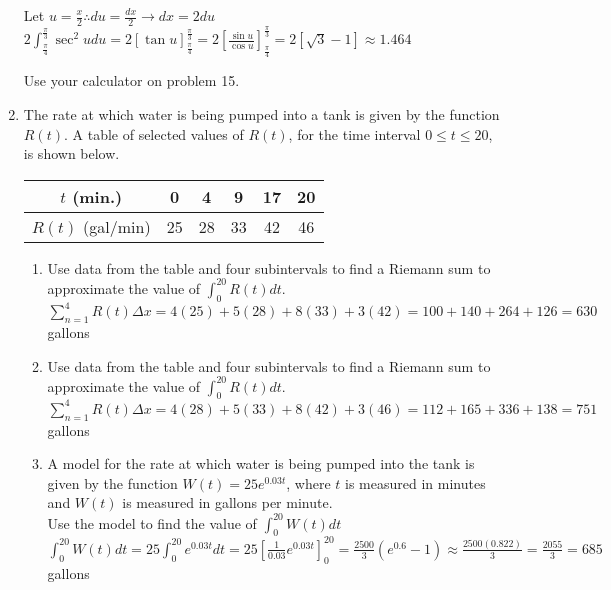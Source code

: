 \documentclass[10pt, letterpaper]{report}
\begin{document}
\begin{enumerate}
    Let $u=\frac{x}{2}\therefore du=\frac{dx}{2}\rightarrow dx=2du$ \\

    $2\int_{\frac{\pi}{4}}^{\frac{\pi}{3}}\sec^{2}{u}du=
    2[\tan{u}]_{\frac{\pi}{4}}^{\frac{\pi}{3}}=
    2[\frac{\sin{u}}{\cos{u}}]_{\frac{\pi}{4}}^{\frac{\pi}{3}}=
    2[\sqrt{3}-1]\approx1.464$ \\

\hline
  \par Use your calculator on problem 15.
  \item{The rate at which water is being pumped into a tank is given by the function $R(t)$. A table of selected values of $R(t)$, for the time interval $0\leq t\leq 20$, is shown below.
    \begin{center}
      \begin{tabular}{| c | c | c | c | c | c |}
        \hline
        $t$ (min.) & 0 & 4 & 9 & 17 & 20 \\
        \hline
        $R(t)$ (gal/min) & 25 & 28 & 33 & 42 & 46 \\
        \hline
      \end{tabular}
    \end{center}}
    \begin{enumerate}
      \item{Use data from the table and four subintervals to find a  Riemann sum to approximate the value of $\int_{0}^{20}R(t)dt$.} \\

        $\sum_{n=1}^{4}R(t)\Delta x=4(25)+5(28)+8(33)+3(42)=100+140+264+126=630$  gallons \\

      \item{Use data from the table and four subintervals to find a  Riemann sum to approximate the value of $\int_{0}^{20}R(t)dt$.} \\

        $\sum_{n=1}^{4}R(t)\Delta x=4(28)+5(33)+8(42)+3(46)=112+165+336+138=751$ gallons \\

      \item{A model for the rate at which water is being pumped into the tank is given by the function $W(t)=25e^{0.03t}$, where $t$ is measured in minutes and $W(t)$ is measured in gallons per minute. \\

      Use the model to find the value of $\int_{0}^{20}W(t)dt$} \\

        $\int_{0}^{20}W(t)dt=
        25\int_{0}^{20}e^{0.03t}dt=
        25[\frac{1}{0.03}e^{0.03t}]_{0}^{20}=
        \frac{2500}{3}(e^{0.6}-1)\approx
        \frac{2500(0.822)}{3}=
        \frac{2055}{3}=685$ gallons \\

    \end{enumerate}
\end{enumerate}
\end{document}
